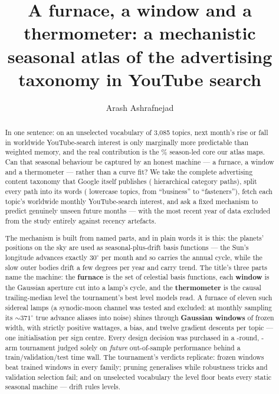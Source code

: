 \documentclass[11pt]{artaquest}
\title{A furnace, a window and a thermometer: a mechanistic seasonal atlas of the advertising taxonomy in YouTube search}
\author{Arash Ashrafnejad\affmark{1}}
\affiliation{\affmark{1}ArtaQuest Foundation}
\begin{document}
\maketitle

\begin{abstract}
In one sentence: on an unselected vocabulary of 3{,}085 topics, next month's rise or fall in worldwide YouTube-search interest is only marginally more predictable than weighted memory, and the real contribution is the \predictablePct\% season-led core our atlas maps. Can that seasonal behaviour be captured by an honest machine --- a furnace, a window and a thermometer --- rather than a curve fit? We take the complete advertising content taxonomy that Google itself publishes (\nPaths{} hierarchical category paths), split every path into its words (\nVocab{} lowercase topics, from ``business'' to ``fasteners''), fetch each topic's worldwide monthly YouTube-search interest, and ask a fixed mechanism to predict genuinely unseen future months --- with the most recent year of data excluded from the study entirely against recency artefacts.

The mechanism is built from named parts, and in plain words it is this: the planets' positions on the sky are used as seasonal-plus-drift basis functions --- the Sun's longitude advances exactly $30^{\circ}$ per month and so carries the annual cycle, while the slow outer bodies drift a few degrees per year and carry trend. The title's three parts name the machine: the \textbf{furnace} is the set of celestial basis
functions, each \textbf{window} is the Gaussian aperture cut into a lamp's cycle, and the
\textbf{thermometer} is the causal trailing-median level the tournament's best level models
read. A furnace of eleven such sidereal lamps (a synodic-moon channel was tested and excluded: at monthly sampling its ${\sim}371^{\circ}$ true advance aliases into noise) shines through \textbf{Gaussian windows} of frozen width, with strictly positive wattages, a bias, and twelve gradient descents per topic --- one initialisation per sign centre. Every design decision was purchased in a \nRounds{}-round, \nArms{}-arm tournament judged solely on \emph{future} out-of-sample performance behind a train/validation/test time wall. The tournament's verdicts replicate: frozen windows beat trained windows in every family; pruning generalises while robustness tricks and validation selection fail; and on unselected vocabulary the level floor beats every static seasonal machine --- drift rules levels.


\end{abstract}
\end{document}

